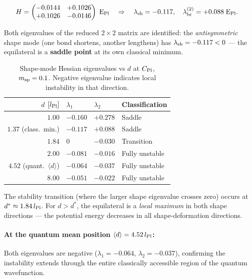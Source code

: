\begin{equation}
  H = \begin{pmatrix}
    -0.0144 & +0.1026 \\
    +0.1026 & -0.0146
  \end{pmatrix}\;\text{E}_{\rm Pl}
  \quad\Rightarrow\quad
  \lambda_{\rm sh} = -0.117,\quad \lambda_{\rm br}^{(2)} = +0.088\;\text{E}_{\rm Pl}.
\end{equation}

Both eigenvalues of the reduced $2\times2$ matrix are identified: the
\emph{antisymmetric} shape mode (one bond shortens, another lengthens)
has $\lambda_{\rm sh}=-0.117<0$ — the equilateral is a \textbf{saddle point}
at its own classical minimum.

\begin{table}[h]
\centering
\caption{Shape-mode Hessian eigenvalues vs $d$ at $C_{\rm Pl}$, $m_{\rm sp}=0.1$.
Negative eigenvalue indicates local instability in that direction.}
\label{tab:shape_hessian}
\begin{tabular}{rlll}
\hline
$d$ $[l_{\rm Pl}]$ & $\lambda_1$ & $\lambda_2$ & Classification \\
\hline
$1.00$ & $-0.160$ & $+0.278$ & Saddle \\
$1.37$ (class.\ min.) & $-0.117$ & $+0.088$ & Saddle \\
$1.84$ & $0$ & $-0.030$ & Transition \\
$2.00$ & $-0.081$ & $-0.016$ & Fully unstable \\
$4.52$ (quant.\ $\langle d\rangle$) & $-0.064$ & $-0.037$ & Fully unstable \\
$8.00$ & $-0.051$ & $-0.022$ & Fully unstable \\
\hline
\end{tabular}
\end{table}

\noindent
The stability transition (where the larger shape eigenvalue crosses zero)
occurs at $d^*\approx1.84\,l_{\rm Pl}$.  For $d>d^*$, the equilateral
is a \emph{local maximum} in both shape directions — the potential energy
decreases in all shape-deformation directions.

\paragraph{At the quantum mean position $\langle d\rangle=4.52\,l_{\rm Pl}$:}
Both eigenvalues are negative ($\lambda_1=-0.064$, $\lambda_2=-0.037$),
confirming the instability extends through the entire classically accessible
region of the quantum wavefunction.

